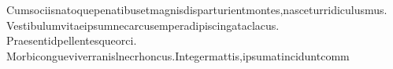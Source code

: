 \documentclass[../main.tex]{subfiles}
\begin{document}
\noindent

Cumsociisnatoquepenatibusetmagnisdisparturientmontes,nasceturridiculusmus.
Vestibulumvitaeipsumnecarcusemperadipiscingataclacus.
Praesentidpellentesqueorci.
Morbicongueviverranislnecrhoncus.Integermattis,ipsumatinciduntcomm
\end{document}
